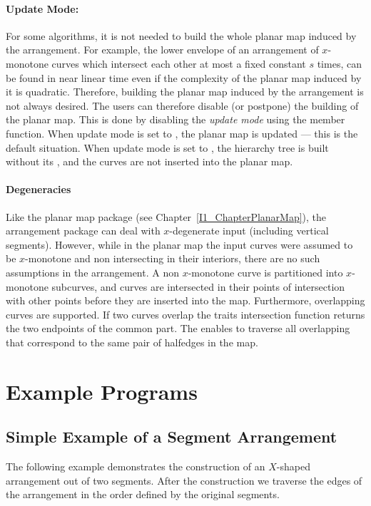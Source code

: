 \paragraph{Update Mode:} For some algorithms, it is not needed to build
the whole planar map induced by the arrangement. For example, the lower
envelope of an arrangement of $x$-monotone curves which intersect
each other at most a fixed constant $s$ times,
can be found in near linear time \cite{sa-dsstg-95, h-a-97}
even if
the complexity of the planar map induced by it is quadratic.
Therefore, building the planar map induced by the arrangement is not
always desired. The users can therefore disable (or postpone) the building
of the planar map. This is done by disabling the {\it update mode}
using the  member function. When update mode is
set to , the planar map is updated --- this is the
default situation. 
When update mode is set to , the hierarchy tree is built without
its , and the curves are not inserted into the planar map.

\paragraph{Degeneracies} Like the planar map package (see
Chapter~\ref{I1_ChapterPlanarMap}), the arrangement package can deal with
$x$-degenerate input (including vertical segments). However, while in the
planar map the input curves were assumed to be $x$-monotone and non
intersecting in their interiors, there are no such assumptions in the
arrangement. A non $x$-monotone curve is partitioned into $x$-monotone
subcurves, and curves are intersected in their points of intersection
with other points
before they are inserted into the map. Furthermore, overlapping curves are
supported. If two curves overlap the traits intersection function returns
the two endpoints of the common part. The 
enables to traverse all overlapping  that correspond to
the same pair of halfedges in the map.






\section{Example Programs}
\subsection{Simple Example of a Segment Arrangement}
The following example demonstrates the construction of an
$X$-shaped arrangement out of two segments.
After the construction we
traverse the edges of the arrangement in the order defined
by the original segments.

